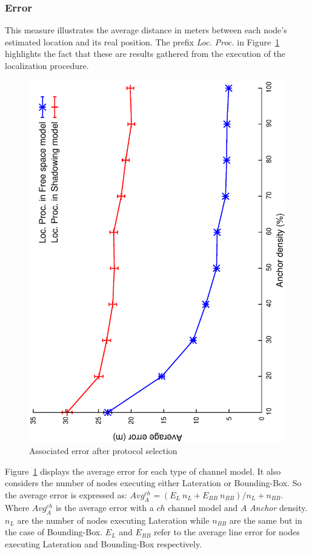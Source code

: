 \subsubsection{Error}
This measure illustrates the average distance in meters between each node's estimated location and its real position. The prefix \emph{Loc. Proc.} in Figure~\ref{pme:error} highlights the fact that these are results gathered from the execution of the localization procedure.

\begin{figure}[tb]
  \centering
  \includegraphics[width=0.7\linewidth, angle = -90]{section4/figures/pmeAverageErrorPerProtocol.eps}
  \caption{Associated error after protocol selection
  \label{pme:error}}
\end{figure}

Figure~\ref{pme:error} displays the average error for each type of channel model. It also considers the number of nodes executing either Lateration or Bounding-Box. So the average error is expressed as: $Avg_{A}^{ch} = (E_{L}~n_{L} + E_{BB}~n_{BB}) /n_{L}+n_{BB}$. Where $Avg_{A}^{ch}$ is the average error with a $ch$ channel model and $A$ \emph{Anchor} density. $n_{L}$ are the number of nodes executing Lateration while $n_{BB}$ are the same but in the case of Bounding-Box. $E_{L}$ and $E_{BB}$ refer to the average line error for nodes executing Lateration and Bounding-Box respectively.

